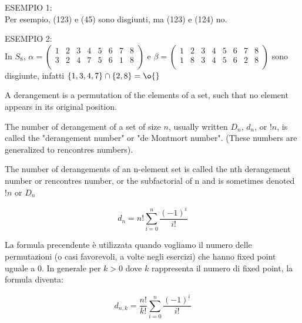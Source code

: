 ESEMPIO 1: \\
Per esempio, (123) e (45) sono disgiunti, ma (123) e (124) no. 

ESEMPIO 2: \\
In $S_{8}$, $\alpha = \left( \begin{array}{cccccccc} 1 & 2 & 3 & 4 & 5 & 6 & 7 & 8 \\ 3 & 2 & 4 & 7 & 5 & 6 & 1 & 8 \\ \end{array} \right)$
e $\beta = \left( \begin{array}{cccccccc} 1 & 2 & 3 & 4 & 5 & 6 & 7 & 8 \\ 1 & 8 & 3 & 4 & 5 & 6 & 2 & 8 \\ \end{array} \right)$
sono disgiunte, infatti $\{ 1,3,4,7 \} \cap \{ 2,8 \} = \o{}$


\begin{definizione}[Derangement]
	A derangement is a permutation of the elements of a set, such that no element appears in its original 
	position. 
\end{definizione}

\begin{definizione}
	The number of derangement of a set of size $n$, usually written $D_{n}$, $d_{n}$, or $!n$, is called the "derangement number" or
	"de Montmort number". (These numbers are generalized to rencontres numbers). 
	
	The number of derangements of an n-element set is called the nth derangement number or rencontres number, or the subfactorial
	of n and is sometimes denoted $!n$ or $D_{n}$
\end{definizione}

\begin{definizione}
	\[
	d_{n} = n!\sum^{n}_{i=0} \frac{(-1)^i}{i!}
	\]
\end{definizione}

\begin{definizione}
	La formula precendente è utilizzata quando vogliamo il numero delle permutazioni (o casi favorevoli, a volte negli esercizi) che hanno fixed point uguale a 0.
	In generale per $k>0$ dove $k$ rappresenta il numero di fixed point, la formula diventa:
	
	\[
	d_{n,k} = \frac{n!}{k!}\sum^{n}_{i=0} \frac{(-1)^i}{i!}
	\]
	
\end{definizione}

